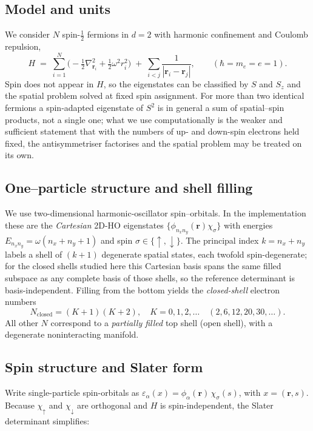 \subsection{Model and units}
We consider $N$ spin-$\tfrac12$ fermions in $d{=}2$ with harmonic confinement and Coulomb repulsion,
\[
H \;=\; \sum_{i=1}^N\!\bigg(-\tfrac12\nabla_{\mathbf r_i}^2 + \tfrac12 \omega^2 r_i^2\bigg)
\;+\;\sum_{i<j}\frac{1}{|\mathbf r_i-\mathbf r_j|}, \qquad (\hbar=m_e=e=1).
\]
Spin does not appear in $H$, so the eigenstates can be classified by $S$ and $S_z$ and the
spatial problem solved at fixed spin assignment. For more than two identical fermions a
spin-adapted eigenstate of $S^2$ is in general a sum of spatial--spin products, not a single one; what we use computationally is the weaker and sufficient statement that with the
numbers of up- and down-spin electrons held fixed, the antisymmetriser factorises and the
spatial problem may be treated on its own.

\subsection{One–particle structure and shell filling}
We use two-dimensional harmonic-oscillator spin–orbitals. In the implementation these are
the \emph{Cartesian} 2D-HO eigenstates $\{\phi_{n_x n_y}(\mathbf r)\chi_\sigma\}$ with
energies $E_{n_x n_y}=\omega (n_x+n_y+1)$ and spin $\sigma\in\{\uparrow,\downarrow\}$.
The principal index $k=n_x+n_y$ labels a shell of $(k{+}1)$ degenerate spatial states, each
twofold spin-degenerate; for the closed shells studied here this Cartesian basis spans the
same filled subspace as any complete basis of those shells, so the reference determinant is
basis-independent. Filling from the bottom yields the \emph{closed-shell} electron numbers
\[
N_{\mathrm{closed}}=(K{+}1)(K{+}2), \quad K=0,1,2,\dots \quad (2,6,12,20,30,\dots).
\]
All other $N$ correspond to a \emph{partially filled} top shell (open shell), with a degenerate
noninteracting manifold.

\subsection{Spin structure and Slater form}
Write single-particle spin-orbitals as $\varepsilon_\alpha(x)=\phi_\alpha(\mathbf r)\,\chi_{\sigma}(s)$,
with $x=(\mathbf r,s)$. Because $\chi_\uparrow$ and $\chi_\downarrow$ are orthogonal and $H$ is
spin-independent, the Slater determinant simplifies:

